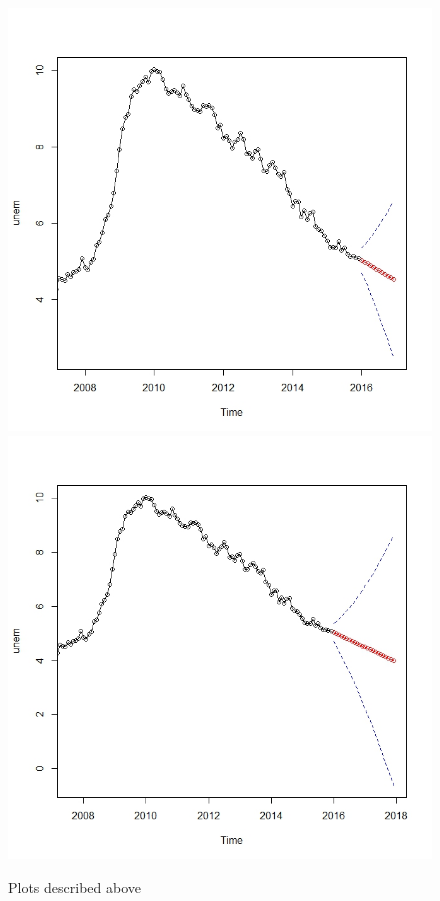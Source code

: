 \documentclass[twoside,twocolumn]{article}
\begin{document}
  \begin{figure}[H]
    	\centering
     	\caption{Plots described above}
     	\includegraphics[width=.9\linewidth]{images/fore2}
     	\includegraphics[width=.9\linewidth]{images/fore3}

\end{figure}
\end{document}
